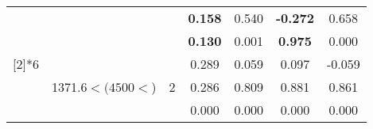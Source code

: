 \begin{table}[htbp]
\begin{tabular}{ccccccc}
          &       &       & \textbf{0.158 } & 0.540  & \textbf{-0.272 } & 0.658  \\
          &       &       & \textbf{0.130 } & 0.001  & \textbf{0.975 } & 0.000  \bigstrut\\\cline{4-7}\noalign{\smallskip}
    \multirow{3}[2]{*}{6} & \multirow{3}[2]{2.5cm}{1371.6$< (4500<$)} & \multirow{3}[2]{*}{2} & 0.289  & 0.059  & 0.097  & -0.059  \\
          &       &       & 0.286  & 0.809  & 0.881  & 0.861  \\
          &       &       & 0.000  & 0.000  & 0.000  & 0.000  \\
    \bottomrule
    \end{tabular}%
  \label{tab:Set3SWJD}%
\end{table}%
